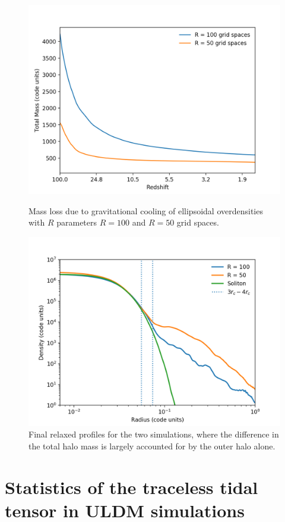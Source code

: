 \documentclass[a4paper,11pt]{article}
\begin{document}
\begin{figure}[!htb]
  \includegraphics[trim={2cm 0 1cm 0cm},scale=0.55]{mass_loss_comp.png}
  \caption{Mass loss due to gravitational cooling of ellipsoidal overdensities with $R$ parameters $R =100$ and $R = 50$ grid spaces.}\label{fig:mass_loss_comp}
\endminipage\hfill
{}
  \includegraphics[trim={2cm 0 1cm 0cm},scale=0.55]{profiles_comp.png}
  \caption{Final relaxed profiles for the two simulations, where the difference in the total halo mass is largely accounted for by the outer halo alone.}\label{fig:profiles_comp}
\endminipage\hfill
\end{figure}


\section{Statistics of the traceless tidal tensor in ULDM simulations}\label{sec:stats}
\end{document}
